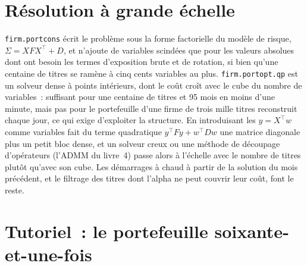 \section{Résolution à grande échelle}

\texttt{firm.portcons} écrit le problème sous la forme factorielle du modèle de risque, $\Sigma = XFX^\top + D$, et n'ajoute de variables scindées que pour les valeurs absolues
dont ont besoin les termes d'exposition brute et de rotation, si bien qu'une centaine de titres se ramène à cinq cents variables au plus. \texttt{firm.portopt.qp} est un solveur dense à points intérieurs, dont le coût
croît avec le cube du nombre de variables~: suffisant pour une centaine de titres et 95 mois en moins d'une minute, mais pas pour le portefeuille d'une firme de trois mille titres reconstruit
chaque jour, ce qui exige d'exploiter la structure. En introduisant les 
$y = X^\top w$ comme variables fait du terme quadratique $y^\top F y + w^\top D w$ une matrice diagonale plus un petit bloc dense, et un solveur creux ou une méthode de découpage d'opérateurs
(l'ADMM du livre~4) passe alors à l'échelle avec le nombre de titres plutôt qu'avec son cube. Les démarrages à chaud à partir de la solution du mois précédent, et le filtrage des titres dont
l'alpha ne peut couvrir leur coût, font le reste.

\section{Tutoriel~: le portefeuille soixante-et-une-fois}\label{tut:rs:portfolio-construction-i:tut}

